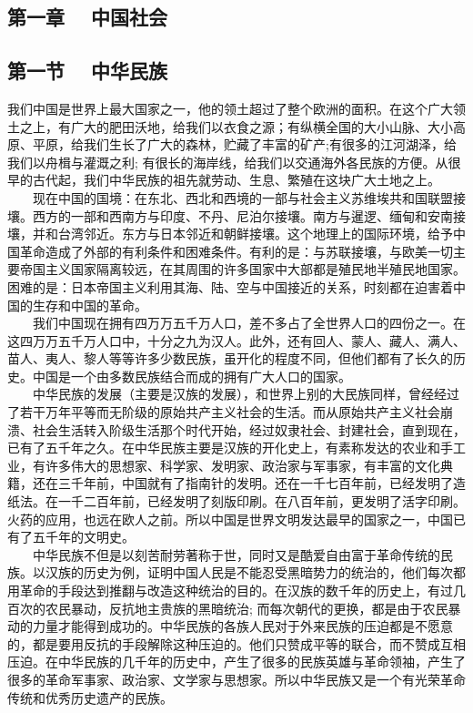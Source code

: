 \documentclass[cn,11pt,chinese]{elegantbook}
\def\myformat#1{\hfil\hfil #1}
\begin{document}
\subsection*{\myformat{第一章 　中国社会}}
\subsection*{\myformat{第一节 　中华民族}}
我们中国是世界上最大国家之一，他的领土超过了整个欧洲的面积。在这个广大领土之上，有广大的肥田沃地，给我们以衣食之源；有纵横全国的大小山脉、大小高原、平原，给我们生长了广大的森林，贮藏了丰富的矿产;有很多的江河湖泽，给我们以舟楫与灌溉之利; 有很长的海岸线，给我们以交通海外各民族的方便。从很早的古代起，我们中华民族的祖先就劳动、生息、繁殖在这块广大土地之上。\\
　　现在中国的国境：在东北、西北和西境的一部与社会主义苏维埃共和国联盟接壤。西方的一部和西南方与印度、不丹、尼泊尔接壤。南方与暹逻、缅甸和安南接壤，并和台湾邻近。东方与日本邻近和朝鲜接壤。这个地理上的国际环境，给予中国革命造成了外部的有利条件和困难条件。有利的是：与苏联接壤，与欧美一切主要帝国主义国家隔离较远，在其周围的许多国家中大部都是殖民地半殖民地国家。困难的是：日本帝国主义利用其海、陆、空与中国接近的关系，时刻都在迫害着中国的生存和中国的革命。\\
　　我们中国现在拥有四万万五千万人口，差不多占了全世界人口的四份之一。在这四万万五千万人口中，十分之九为汉人。此外，还有回人、蒙人、藏人、满人、苗人、夷人、黎人等等许多少数民族，虽开化的程度不同，但他们都有了长久的历史。中国是一个由多数民族结合而成的拥有广大人口的国家。\\
　　中华民族的发展（主要是汉族的发展），和世界上别的大民族同样，曾经经过了若干万年平等而无阶级的原始共产主义社会的生活。而从原始共产主义社会崩溃、社会生活转入阶级生活那个时代开始，经过奴隶社会、封建社会，直到现在，已有了五千年之久。在中华民族主要是汉族的开化史上，有素称发达的农业和手工业，有许多伟大的思想家、科学家、发明家、政治家与军事家，有丰富的文化典籍，还在三千年前，中国就有了指南针的发明。还在一千七百年前，已经发明了造纸法。在一千二百年前，已经发明了刻版印刷。在八百年前，更发明了活字印刷。火药的应用，也远在欧人之前。所以中国是世界文明发达最早的国家之一，中国已有了五千年的文明史。\\
　　中华民族不但是以刻苦耐劳著称于世，同时又是酷爱自由富于革命传统的民族。以汉族的历史为例，证明中国人民是不能忍受黑暗势力的统治的，他们每次都用革命的手段达到推翻与改造这种统治的目的。在汉族的数千年的历史上，有过几百次的农民暴动，反抗地主贵族的黑暗统治; 而每次朝代的更换，都是由于农民暴动的力量才能得到成功的。中华民族的各族人民对于外来民族的压迫都是不愿意的，都是要用反抗的手段解除这种压迫的。他们只赞成平等的联合，而不赞成互相压迫。在中华民族的几千年的历史中，产生了很多的民族英雄与革命领袖，产生了很多的革命军事家、政治家、文学家与思想家。所以中华民族又是一个有光荣革命传统和优秀历史遗产的民族。\\
\end{document}
